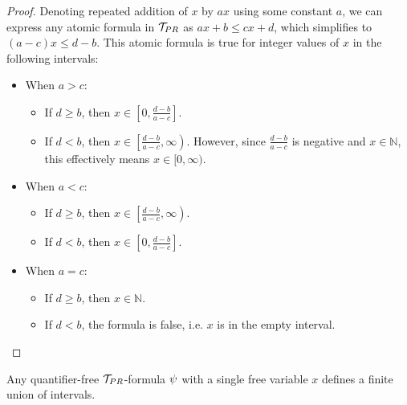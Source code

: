 \begin{proof}
  Denoting repeated addition of $x$ by $ax$ using some constant $a$, we can
  express any atomic formula in $\mathcal{T}_{PR}$ as $ax + b \leq cx + d$, which simplifies
  to $(a-c)x \leq d - b$. This atomic formula is true for integer values of $x$
  in the following intervals:
  \begin{itemize}
    \item When \( a > c \):
      \begin{itemize}
        \item If \( d \geq b \), then \( x \in \left[0, \frac{d - b}{a - c}\right] \).
        \item If \( d < b \), then \( x \in \left[\frac{d - b}{a - c}, \infty\right) \). However, since \( \frac{d - b}{a - c} \) is negative and $x \in \mathbb N$, this effectively means \( x \in [0, \infty) \).
      \end{itemize}

    \item When \( a < c \):
      \begin{itemize}
        \item If \( d \geq b \), then \( x \in \left[\frac{d - b}{a - c}, \infty\right) \).
        \item If \( d < b \), then \( x \in \left[0, \frac{d - b}{a - c}\right] \).
      \end{itemize}

    \item When \( a = c \):
      \begin{itemize}
        \item If \( d \geq b \), then \( x \in \mathbb{N} \).
        \item If \( d < b \), the formula is false, i.e. $x$ is in the empty interval.
      \end{itemize}
  \end{itemize}
\end{proof}

\begin{theorem}
  Any quantifier-free $\mathcal{T}_{PR}$-formula $\psi$ with a single free variable $x$ defines
  a finite union of intervals.
\end{theorem}

